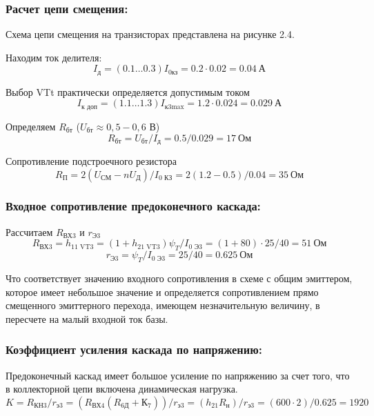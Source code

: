 \subsubsection{Расчет цепи смещения:}

Схема цепи смещения на транзисторах представлена на рисунке 2.4. \par
Находим ток делителя:
\begin{equation}
\label{eq:equation3_11}
 I_{\text{д}} = (0.1 \ldots 0.3) I_{\text{0кз}} = 0.2 \cdot 0.02 = 0.04~\text{А}
\end{equation}

Выбор VTt практически определяется допустимым током
\begin{equation}
\label{eq:equation3_12}
 I_{\text{к доп}} = (1.1 \ldots 1.3) I_{\text{к3max}} = 1.2 \cdot 0.024 = 0.029~\text{А}
\end{equation}

Определяем $R_{\text{бт}}$ ($U_{\text{бт}} \approx 0,5 - 0,6$ В)
\begin{equation}
\label{eq:equation3_13}
 R_{\text{бт}} = U_{\text{бт}} / I_{\text{д}} = 0.5/0.029 = 17~\text{Ом}
\end{equation}

Сопротивление подстроечного резистора
\begin{equation}
\label{eq:equation3_14}
 R_{\text{П}} = 2 (U_{\text{СМ}} - n U_{\text{Д}}) / I_{\text{0 КЗ}} = 2 (1.2 - 0.5) / 0.04 = 35~\text{Ом}
\end{equation}

\subsubsection{Входное сопротивление предоконечного каскада:}
Рассчитаем $R_{\text{ВХ3}}$ и $r_{\text{Э3}}$
\begin{equation}
\label{eq:equation3_15}
 R_{\text{ВХ3}} = h_{\text{11 VT3}} = (1 + h_{\text{21 VT3}}) \psi_T / I_{\text{0 Э3}} = (1 + 80) \cdot 25 / 40 = 51~\text{Ом}
\end{equation}
\begin{equation}
\label{eq:equation3_16}
 r_{\text{Э3}} = \psi_T / I_{\text{0 Э3}} = 25/40 = 0.625~\text{Ом}
\end{equation}

Что соответствует значению входного сопротивления в схеме с общим эмиттером, которое имеет небольшое значение и определяется сопротивлением прямо смещенного эмиттерного перехода, имеющем незначительную величину, в пересчете на малый входной ток базы.

\subsubsection{Коэффициент усиления каскада по напряжению:}

Предоконечный каскад имеет большое усиление по напряжению за счет того, что в коллекторной цепи включена динамическая нагрузка.
\begin{equation}
\label{eq:equation3_17}
 K = R_{\text{КН3}} / r_{\text{э3}} = (R_{\text{ВХ4}} ( R_{\text{6Д}} + К_7)) / r_{\text{э3}} = (h_{21} R_{н}) / r_{\text{э3}} = (600 \cdot 2) / 0.625 = 1920
\end{equation}